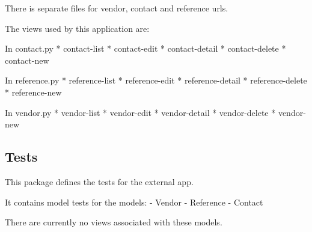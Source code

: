 \documentclass[letterpaper,10pt,english]{sphinxmanual}
\begin{document}
There is separate files for vendor, contact and reference urls.


The views used by this application are:


In contact.py
* contact-list
* contact-edit
* contact-detail
* contact-delete
* contact-new


In reference.py
* reference-list
* reference-edit
* reference-detail
* reference-delete
* reference-new


In vendor.py
* vendor-list
* vendor-edit
* vendor-detail
* vendor-delete
* vendor-new



\subsection{Tests}
\label{api:id12}\label{api:module-experimentdb.external.tests}
This package defines the tests for the external app.


It contains model tests for the models:
- Vendor
- Reference
- Contact


There are currently no views associated with these models.

\end{document}
